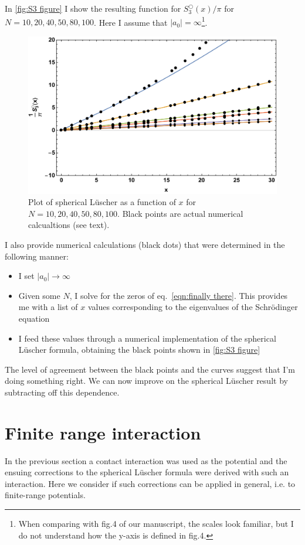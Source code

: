 \documentclass[11pt]{article}
\begin{document}
In \autoref{fig:S3 figure} I show the resulting function for $S^\bigcirc_3(x)/\pi$ for $N=10,20,40,50,80,100$.  Here I assume that $|a_0|=\infty$\footnote{When comparing with fig.4 of our manuscript, the scales look familiar, but I do not understand how the y-axis is defined in fig.4.}.
\begin{figure}
\center
\includegraphics[width=.8\textwidth]{figs/S3_figure.pdf}
\caption{Plot of spherical L\"uscher as a function of $x$ for $N=10,20,40,50,80,100$.  Black points are actual numerical calcualtions (see text).\label{fig:S3 figure}}
\end{figure}
I also provide numerical calculations (black dots) that were determined in the following manner:
\begin{itemize}
\item I set $|a_0|\to\infty$
\item Given some $N$, I solve for the zeros of eq.~\eqref{eqn:finally there}.  This provides me with a list of $x$ values corresponding to the eigenvalues of the Schr\"odinger equation
\item I feed these values through a numerical implementation of the spherical L\"uscher formula, obtaining the black points shown in \autoref{fig:S3 figure}
\end{itemize}
The level of agreement between the black points and the curves suggest that I'm doing something right.  We can now improve on the spherical L\"uscher result by subtracting off this dependence.

\section{Finite range interaction}
In the previous section a contact interaction was used as the potential and the ensuing corrections to the spherical L\"uscher formula were derived with such an interaction.  Here we consider if such corrections can be applied in general, i.e. to finite-range potentials.
\end{document}

